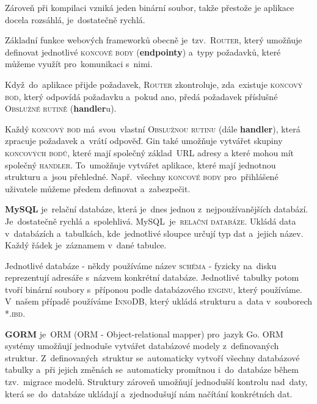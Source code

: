 \documentclass[14pt,a4paper]{article}
\begin{document}
            Zároveň při kompilaci vzniká jeden binární soubor, takže přestože je aplikace docela rozsáhlá, je~dostatečně rychlá.

            Základní funkce webových frameworků obecně je~tzv.~\textsc{Router}, který umožňuje definovat jednotlivé \textsc{koncové body} (\textbf{endpointy}) a~typy požadavků, které můžeme využít pro~komunikaci s~nimi.
            
            Když~do~aplikace přijde požadavek, \textsc{Router} zkontroluje, zda~existuje \textsc{koncový bod}, který odpovídá požadavku a~pokud ano, předá požadavek příslušné \textsc{Obslužné rutině} (\textbf{handler}u).

            Každý \textsc{koncový bod} má~svou~vlastní \textsc{Obslužnou rutinu} (dále \textbf{handler}), která zpracuje požadavek a~vrátí odpověď.
            Gin také umožňuje vytvářet skupiny \textsc{koncových bodů}, které mají společný základ~URL adresy a které mohou mít společný \textsc{handler}.
            To~umožňuje vytvářet aplikace, které mají jednotnou strukturu a~jsou přehledné. Např.~všechny \textsc{koncové body} pro~přihlášené
            uživatele můžeme předem definovat a~zabezpečit.
            
            \textbf{MySQL} je~relační databáze, která je~dnes jednou z~nejpoužívanějších databází. Je~dostatečně rychlá a~spolehlivá. \parencite{databases21}
            MySQL~je~\textsc{relační databáze}. Ukládá data v~databázích a~tabulkách, kde~jednotlivé sloupce určují typ dat a~jejich název. Každý řádek je~záznamem v~dané tabulce.
            
            Jednotlivé databáze - někdy používáme název \textsc{schéma} - fyzicky na~disku reprezentují adresáře s~názvem konkrétní databáze. Jednotlivé~tabulky potom tvoří binární soubory s~příponou podle databázového \textsc{enginu}, který používáme. V~našem případě používáme \textsc{InnoDB}, který ukládá strukturu a~data v~souborech \textsc{*.ibd}. \parencite{MySQLInnoDB}
            
            \textbf{GORM} je~ORM (ORM - Object-relational mapper) pro~jazyk Go. \textsc{ORM} systémy umožňují jednoduše vytvářet databázové modely z~definovaných struktur. 
            Z~definovaných~struktur se~automaticky vytvoří všechny databázové tabulky a~při jejich změnách se~automaticky promítnou i~do~databáze během tzv.~migrace modelů.
            Struktury zároveň umožňují jednodušší kontrolu nad~daty, která se~do~databáze ukládají a~zjednodušují nám načítání konkrétních dat. \parencite{freecodecamp:orm}
\end{document}
